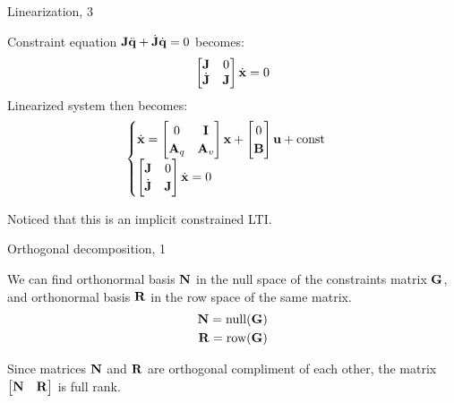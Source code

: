 \documentclass{beamer}
\begin{document}
\begin{frame}{Linearization, 3}
	\begin{flushleft}
		
		Constraint equation $\mathbf{J} \ddot{\mathbf{q}} + \dot{\mathbf{J}} \dot{\mathbf{q}}= 0$ becomes:
		\begin{align}
			\begin{bmatrix}
				\mathbf{J}  & 0 \\
				\dot{\mathbf{J}} & \mathbf{J}
			\end{bmatrix}
		\dot{\mathbf{x}}
		= 0
		\end{align}
		Linearized system then becomes:
			\begin{align}
				\begin{cases}
					\dot{\mathbf{x}} = 
					\begin{bmatrix}
						0 & \mathbf{I} \\
						\mathbf{A}_q & \mathbf{A}_v
					\end{bmatrix}
					\mathbf{x}
					+
					\begin{bmatrix}
						0 \\
						\mathbf{B}
					\end{bmatrix}
					\mathbf{u}
					+
					\text{const}
					\\
					\begin{bmatrix}
						\mathbf{J}  & 0 \\
						\dot{\mathbf{J}} & \mathbf{J}
					\end{bmatrix}
					\dot{\mathbf{x}}
					= 0
				\end{cases}
		\end{align}
	
	Noticed that this is an implicit constrained LTI.
		
	\end{flushleft}
\end{frame}




\begin{frame}{Orthogonal decomposition, 1}
	\begin{flushleft}
		
		We can find orthonormal basis $\mathbf{N}$ in the null space of the constraints matrix $\mathbf{G}$, and orthonormal basis $\mathbf{R}$ in the row space of the same matrix.
			\begin{align}
				\mathbf{N} = \text{null}(\mathbf{G}) \\
				\mathbf{R} = \text{row}(\mathbf{G})
			\end{align}
		
		Since matrices $\mathbf{N}$ and $\mathbf{R}$ are orthogonal compliment of each other, the matrix $\begin{bmatrix}
			\mathbf{N} & \mathbf{R}
		\end{bmatrix}$ is full rank.
		
		
	\end{flushleft}
\end{frame}
\end{document}
